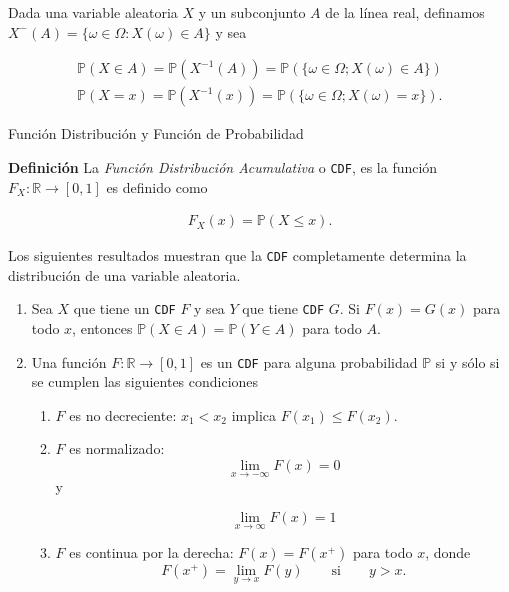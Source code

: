 \documentclass{article}\usepackage[]{graphicx}\usepackage[]{color}
\begin{document}
\vspace{0.5cm}


Dada una variable aleatoria $X$ y un subconjunto $A$ de la l\'inea real, definamos $X^{-}(A) = \{\omega \in \Omega: X(\omega) \in A \}$ y sea

\begin{align*}
\mathbb{P}(X \in A) = \mathbb{P}(X^{-1}(A)) = \mathbb{P}(\{\omega \in \Omega; X(\omega) \in A  \})\\
\mathbb{P}(X = x) = \mathbb{P}(X^{-1}(x)) = \mathbb{P}(\{\omega \in \Omega; X(\omega) = x  \}).
\end{align*}

\vspace{0.5cm}

\large{Funci\'on Distribuci\'on y Funci\'on de Probabilidad}

\vspace{0.3cm}

\textbf{Definici\'on} La \textit{Funci\'on Distribuci\'on  Acumulativa} o \texttt{CDF}, es la funci\'on $F_{X}: \mathbb{R} \rightarrow [0,1]$ es definido como

\begin{align}
F_{X}(x) = \mathbb{P}(X \leq x).
\end{align}

\vspace{0.5cm}

Los siguientes resultados muestran que la \texttt{CDF} completamente determina la \mbox{distribuci\'on} de una variable aleatoria.

\vspace{0.3cm}

\begin{enumerate}
\item Sea $X$ que tiene un \texttt{CDF} $F$ y sea $Y$ que tiene \texttt{CDF} $G$. Si $F(x) = G(x)$ para todo $x$, entonces $\mathbb{P}(X \in A) = \mathbb{P}(Y \in A)$ para todo $A$.
\item Una funci\'on $F: \mathbb{R} \rightarrow [0,1]$ es un \texttt{CDF} para alguna probabilidad $\mathbb{P}$ si y s\'olo si se cumplen las siguientes condiciones

\begin{enumerate}
\item $F$ es no decreciente: $x_1 < x_2$ implica $F(x_1) \leq F(x_2)$.
\item $F$ es normalizado: 
\[
\lim_{x \rightarrow -\infty}F(x) = 0
\]
y 

\[
\lim_{x \rightarrow \infty}F(x) = 1
\]
\item $F$ es continua por la derecha: $F(x) = F(x^{+})$ para todo $x$, donde
\[
F(x^{+}) = \lim_{y \rightarrow x}F(y) \qquad \mbox{si} \qquad y > x.
\]
\end{enumerate}
\end{enumerate}
\end{document}
